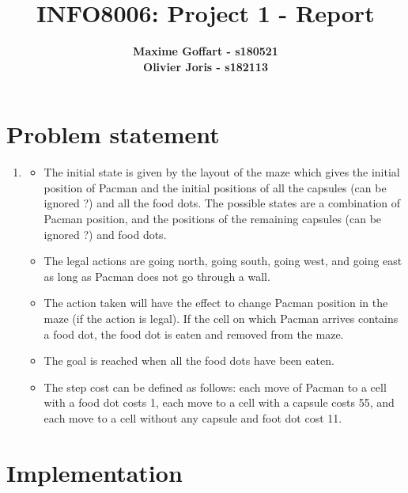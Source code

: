 \documentclass{article}
\begin{document}

\title{\Large{INFO8006: Project 1 - Report}}
\vspace{1cm}
\author{\small{\bf Maxime Goffart - s180521} \\ \small{\bf Olivier Joris - s182113}}

\maketitle


\section{Problem statement}

\begin{enumerate}[label=\alph*.,leftmargin=1.35em]
    \item
    	\begin{itemize}
    		\item The initial state is given by the layout of the maze which gives the initial position of Pacman and the initial positions of all the capsules (can be ignored ?) and all the food dots. The possible states are a combination of Pacman position, and the positions of the remaining capsules (can be ignored ?) and food dots.
    		\item The legal actions are going north, going south, going west, and going east as long as Pacman does not go through a wall.
    		\item The action taken will have the effect to change Pacman position in the maze (if the action is legal). If the cell on which Pacman arrives contains a food dot, the food dot is eaten and removed from the maze.
    		\item The goal is reached when all the food dots have been eaten.
    		\item The step cost can be defined as follows: each move of Pacman to a cell with a food dot costs 1, each move to a cell with a capsule costs 55, and each move to a cell without any capsule and foot dot cost 11.
    	\end{itemize}
\end{enumerate}

\section{Implementation}
\end{document}
